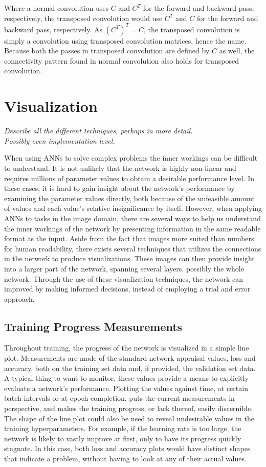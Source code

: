 \noindent Where a normal convolution uses $C$ and $C^T$ for the forward and backward pass, respectively, the transposed convolution would use $C^T$ and $C$ for the forward and backward pass, respectively. As $(C^T)^T=C$, the transposed convolution is simply a convolution using transposed convolution matrices, hence the name. Because both the passes in transposed convolution are defined by $C$ as well, the connectivity pattern found in normal convolution also holds for transposed convolution. \\

\section{Visualization}
\textit{Describe all the different techniques, perhaps in more detail. \\
Possibly even implementation level.}

When using ANNs to solve complex problems the inner workings can be difficult to understand. It is not unlikely that the network is highly non-linear and requires millions of parameter values to obtain a desirable performance level. In these cases, it is hard to gain insight about the network's performance by examining the parameter values directly, both because of the unfeasible amount of values and each value's relative insignificance by itself. However, when applying ANNs to tasks in the image domain, there are several ways to help us understand the inner workings of the network by presenting information in the same readable format as the input. Aside from the fact that images more suited than numbers for human readability, there exists several techniques that utilizes the connections in the network to produce visualizations. These images can then provide insight into a larger part of the network, spanning several layers, possibly the whole network. Through the use of these visualization techniques, the network can improved by making informed decisions, instead of employing a trial and error approach. 

\subsection{Training Progress Measurements}

Throughout training, the progress of the network is visualized in a simple line plot. Measurements are made of the standard network appraisal values, loss and accuracy, both on the training set data and, if provided, the validation set data. A typical thing to want to monitor, these values provide a means to explicitly evaluate a network's performance. Plotting the values against time, at certain batch intervals or at epoch completion, puts the current measurements in perspective, and makes the training progress, or lack thereof, easily discernible. The shape of the line plot could also be used to reveal undesirable values in the training hyperparameters. For example, if the learning rate is too large, the network is likely to vastly improve at first, only to have its progress quickly stagnate. In this case, both loss and accuracy plots would have distinct shapes that indicate a problem, without having to look at any of their actual values.

